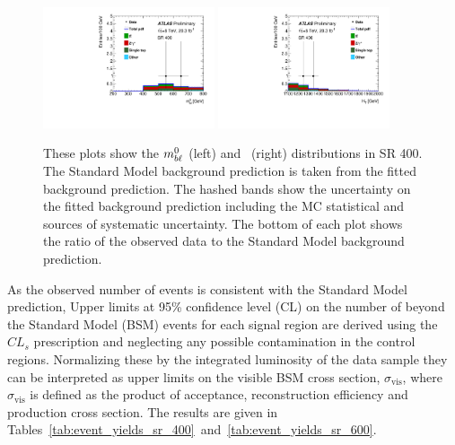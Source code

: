 \begin{figure}[ht]
  \centering
  \includegraphics[width=0.45\textwidth]{figs/blstop/sr_mbl_0.pdf}
  \includegraphics[width=0.45\textwidth]{figs/blstop/sr_ht.pdf}
  \caption{These plots show the $m_{b\ell}^0$ (left) and \HT\ (right) distributions
    in SR 400. The Standard Model background prediction is taken from the
    fitted background prediction. The hashed bands show
    the uncertainty on the fitted background prediction including the MC
    statistical and sources of systematic uncertainty.  The bottom of
    each plot shows the ratio of the observed data to the Standard Model
    background prediction.
  }
  \label{fig:sr_dists}
\end{figure}

As the observed number of events is consistent with the Standard Model
prediction, Upper limits at 95\% confidence level (CL) on the number of
beyond the Standard Model (BSM) events for each signal region are derived
using the $CL_s$ prescription and neglecting any possible contamination in the
control regions. Normalizing these by the integrated luminosity of the data
sample they can be interpreted as upper limits on the visible BSM
cross section, $\sigma_\mathrm{vis}$, where $\sigma_\mathrm{vis}$ is defined
as the product of acceptance, reconstruction efficiency and production
cross section. The results are given in
Tables~\ref{tab:event_yields_sr_400}~and~\ref{tab:event_yields_sr_600}.


